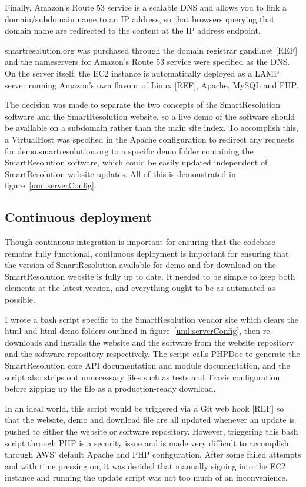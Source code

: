 Finally, Amazon's Route 53 service is a scalable DNS and allows you to link a domain/subdomain name to an IP address, so that browsers querying that domain name are redirected to the content at the IP address endpoint.

smartresolution.org was purchased through the domain registrar gandi.net [REF] and the nameservers for Amazon's Route 53 service were specified as the DNS. On the server itself, the EC2 instance is automatically deployed as a LAMP server running Amazon's own flavour of Linux [REF], Apache, MySQL and PHP.

The decision was made to separate the two concepts of the SmartResolution software and the SmartResolution website, so a live demo of the software should be available on a subdomain rather than the main site index. To accomplish this, a VirtualHost was specified in the Apache configuration to redirect any requests for demo.smartresolution.org to a specific demo folder containing the SmartResolution software, which could be easily updated independent of SmartResolution website updates. All of this is demonstrated in figure~\ref{uml:serverConfig}.

\subsection{Continuous deployment}

Though continuous integration is important for ensuring that the codebase remains fully functional, continuous deployment is important for ensuring that the version of SmartResolution available for demo and for download on the SmartResolution website is fully up to date. It needed to be simple to keep both elements at the latest version, and everything ought to be as automated as possible.

I wrote a bash script specific to the SmartResolution vendor site which clears the html and html-demo folders outlined in figure~\ref{uml:serverConfig}, then re-downloads and installs the website and the software from the website repository and the software repository respectively. The script calls PHPDoc to generate the SmartResolution core API documentation and module documentation, and the script also strips out unnecessary files such as tests and Travis configuration before zipping up the file as a production-ready download.

In an ideal world, this script would be triggered via a Git web hook [REF] so that the website, demo and download file are all updated whenever an update is pushed to either the website or software repository. However, triggering this bash script through PHP is a security issue and is made very difficult to accomplish through AWS' default Apache and PHP configuration. After some failed attempts and with time pressing on, it was decided that manually signing into the EC2 instance and running the update script was not too much of an inconvenience.

